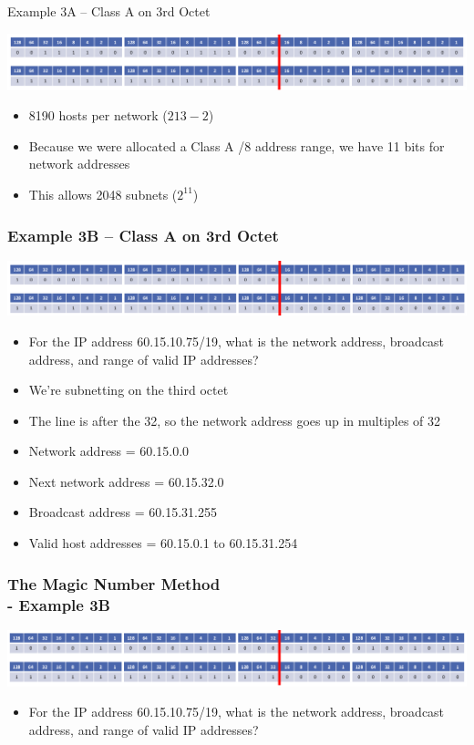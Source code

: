 \documentclass[pdflatex,compress]{beamer}
\begin{document}
\begin{frame}{Example 3A – Class A on 3rd Octet}
	\begin{center}
		\includegraphics[width=\linewidth]{img/img23}
	\end{center}
	\begin{itemize}
		\item 8190 hosts per network ($ 2{13} - 2 $)
		\item Because we were allocated a Class A /8 address range, we have 11 bits for network addresses
		\item This allows 2048 subnets ($ 2^{11} $)
	\end{itemize}
\end{frame}

\begin{frame}
	\frametitle{Example 3B – Class A on 3rd Octet}
	\begin{center}
		\includegraphics[width=\linewidth]{img/img24}
	\end{center}
	\begin{itemize}
		\item<1-> For the IP address 60.15.10.75/19, what is the network address, broadcast address, and range of valid IP addresses?
		\item<2-> We’re subnetting on the third octet
		\item<2-> The line is after the 32, so the network address goes up in multiples of 32
		\item<2-> Network address = 60.15.0.0
		\item<2-> Next network address = 60.15.32.0
		\item<2-> Broadcast address = 60.15.31.255
		\item<2-> Valid host addresses = 60.15.0.1 to 60.15.31.254
	\end{itemize}
\end{frame}

\begin{frame}
	\frametitle{The Magic Number Method\\ - Example 3B}
	\begin{center}
		\includegraphics[width=\linewidth]{img/img25}
	\end{center}
	\begin{itemize}
		\item For the IP address 60.15.10.75/19, what is the network address, broadcast address, and range of valid IP addresses?
	\end{itemize}
\end{frame}
\end{document}
